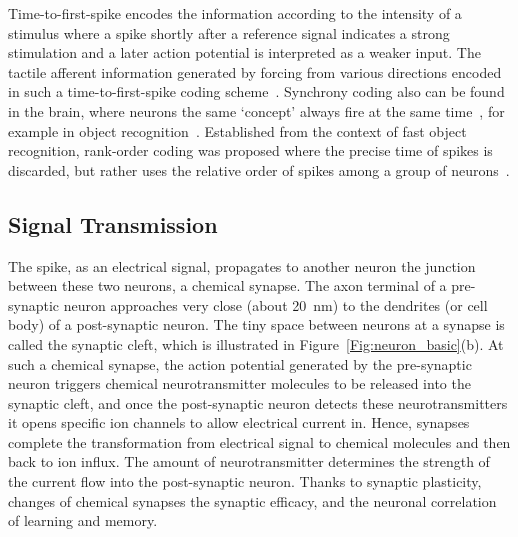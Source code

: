 Time-to-first-spike encodes the information according to the intensity of a stimulus where a spike shortly after a reference signal indicates a strong stimulation and a later action potential is interpreted as a weaker input.
The tactile afferent information generated by forcing \DIFdelbegin {}\DIFdelend \DIFaddbegin {}\DIFaddend from various directions \DIFdelbegin {}\DIFdelend \DIFaddbegin {}\DIFaddend encoded in such a time-to-first-spike coding scheme~\DIFdelbegin {}\DIFdelend \DIFaddbegin {}\DIFaddend .
Synchrony coding also can be found in the brain, where neurons \DIFdelbegin {}\DIFdelend \DIFaddbegin {}\DIFaddend the same `concept' always fire at the same time~\DIFdelbegin {}\DIFdelend \DIFaddbegin {}\DIFaddend , for example in object recognition~\DIFdelbegin {}\DIFdelend \DIFaddbegin {}\DIFaddend .
Established from the context of fast object recognition, rank-order coding was proposed where the precise time of spikes is discarded, but rather uses the relative order of spikes among a group of neurons~\DIFdelbegin {}\DIFdelend \DIFaddbegin {}\DIFaddend .


\subsection{Signal Transmission}
\label{subsec:spike_trans}
The spike, as an electrical signal, propagates to another neuron \DIFdelbegin {}\DIFdelend \DIFaddbegin {}\DIFaddend the junction between these two neurons, a chemical synapse.
The axon terminal of a pre-synaptic neuron approaches very close (\DIFaddbegin {}\DIFaddend about 20~nm) to the dendrites (or cell body) of a  post-synaptic neuron.
The tiny space between neurons at a synapse is called the synaptic cleft, which is illustrated in Figure~\ref{Fig:neuron_basic}(b).
At such a chemical synapse, the action potential generated by the pre-synaptic neuron triggers chemical neurotransmitter molecules to be released into the synaptic cleft, and once the post-synaptic neuron detects these neurotransmitters it opens specific ion channels to allow electrical current in.
Hence, synapses complete the transformation from electrical signal to chemical molecules and then back to ion influx.
The amount of neurotransmitter determines the strength of the current flow into the post-synaptic neuron.
Thanks to synaptic plasticity, changes of chemical synapses \DIFdelbegin {}\DIFdelend \DIFaddbegin {}\DIFaddend the synaptic efficacy, and \DIFdelbegin {}\DIFdelend \DIFaddbegin {}\DIFaddend the neuronal correlation of learning and memory.

